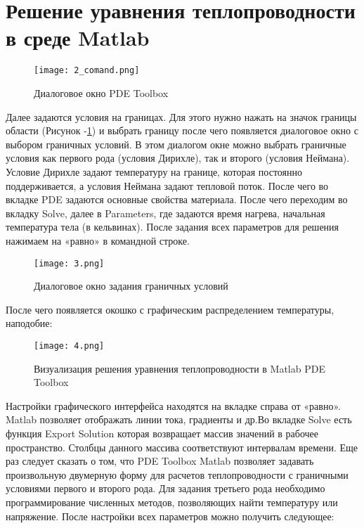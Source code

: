 \documentclass[a4paper,14pt]{article}
\begin{document}
 
\newpage
     
\newpage     
     
     
\tableofcontents %
\newpage
 
\newpage


\section{Решение уравнения теплопроводности в среде Matlab}
 

 
 \begin{figure}[h]
\centering
\texttt{[image: 2\_comand.png]}
\caption{Диалоговое окно PDE Toolbox}
\end{figure} 

Далее задаются условия на границах. Для этого нужно нажать на значок границы области (Рисунок -\ref{111}) и выбрать границу после чего появляется диалоговое окно с выбором граничных условий. В этом диалогом окне можно выбрать граничные условия как первого рода (условия Дирихле), так и второго (условия Неймана). Условие Дирихле задают температуру на границе, которая постоянно поддерживается, а условия Неймана задают тепловой поток. 
 	После чего во вкладке PDE задаются основные свойства материала. После чего переходим во вкладку Solve, далее в Parameters, где задаются время нагрева, начальная температура тела (в кельвинах). После задания всех параметров для решения нажимаем на «равно» в командной строке.
 	
 \begin{figure}[h]
 \label{111}
\centering
\texttt{[image: 3.png]}
\caption{Диалоговое окно задания граничных условий}
\end{figure} 


После чего появляется окошко с графическим распределением температуры, наподобие: 
\begin{figure}[h]
 \label{}
\centering
\texttt{[image: 4.png]}
\caption{Визуализация решения уравнения теплопроводности в Matlab PDE Toolbox}
\end{figure} 


 Настройки графического интерфейса находятся на вкладке справа от «равно». Matlab позволяет отображать линии тока, градиенты и др.Во вкладке Solve есть функция Export Solution которая возвращает массив значений в рабочее пространство. Столбцы данного массива соответствуют интервалам времени. Еще раз следует сказать о том, что PDE Toolbox Matlab позволяет задавать  произвольную двумерную форму для расчетов теплопроводности с граничными условиями первого и второго рода. Для задания третьего рода необходимо программирование численных методов, позволяющих найти температуру или напряжение. После настройки всех параметров можно получить следующее:
 
\end{document}
